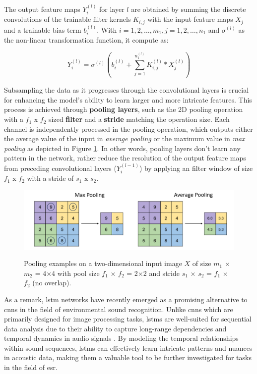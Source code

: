 The output feature maps $Y_i^{(l)}$ for layer $l$ are obtained by summing the discrete convolutions of the trainable filter kernels $K_{i,j}$ with the input feature maps $X_j$ and a trainable bias term $b_i^{(l)}$. With $i = 1, 2,\ldots, m_1, j = 1, 2,\ldots, n_1$ and $\sigma^{(l)}$ as the non-linear transformation function, it compute as:

\begin{equation}
    \label{eq:cnn_convolutional_layer}
    Y_i^{(l)}=\sigma^{(l)}\left(b_i^{(l)}+\sum_{j=1}^{n_1^{(l)}} K_{i, j}^{(l)} * X_j^{(l)}\right)
\end{equation}


Subsampling the data as it progresses through the convolutional layers is crucial for enhancing the model's ability to learn larger and more intricate features. This process is achieved through \textbf{pooling layers}, such as the 2D pooling operation with a $f_1$ x $f_2$ sized \textbf{filter} and a \textbf{stride} matching the operation size. Each channel is independently processed in the pooling operation, which outputs either the average value of the input in \textit{average pooling} or the maximum value in \textit{max pooling} as depicted in Figure \ref{fig:frmwk_cnn_pooling}. In other words, pooling layers don't learn any pattern in the network, rather reduce the resolution of the output feature maps from preceding convolutional layers ($Y_i^{(l-1)}$) by applying an filter window of size $f_1$ x $f_2$ with a stride of $s_1$ x $s_2$.

\begin{figure}[htbp]
    \raggedright
        \caption{Pooling examples on a two-dimensional input image $X$ of size $m_1$ × $m_2$ = 4×4 with pool size $f_1$ × $f_2$ = 2×2 and stride $s_1$ × $s_2$ = $f_1$ × $f_2$ (no overlap).}
        \includegraphics[width=.75\textwidth]{resources/images/030-theoretical_framework/Framework_cnn_pooling.png}
        \label{fig:frmwk_cnn_pooling}
\end{figure}

As a remark, \gls{lstm} networks have recently emerged as a promising alternative to \gls{cnn}s in the field of environmental sound recognition. Unlike \gls{cnn}s which are primarily designed for image processing tasks, \gls{lstm}s are well-suited for sequential data analysis due to their ability to capture long-range dependencies and temporal dynamics in audio signals \cite{Bubashait2021}. By modeling the temporal relationships within sound sequences, \gls{lstm}s can effectively learn intricate patterns and nuances in acoustic data, making them a valuable tool to be further investigated for tasks in the field of \gls{esr}.


